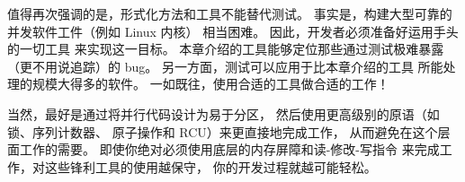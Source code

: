 值得再次强调的是，形式化方法和工具不能替代测试。
事实是，构建大型可靠的并发软件工件（例如 Linux 内核）
相当困难。
因此，开发者必须准备好运用手头的一切工具
来实现这一目标。
本章介绍的工具能够定位那些通过测试极难暴露
（更不用说追踪）的 bug。
另一方面，测试可以应用于比本章介绍的工具
所能处理的规模大得多的软件。
一如既往，使用合适的工具做合适的工作！

当然，最好是通过将并行代码设计为易于分区，
然后使用更高级别的原语（如锁、序列计数器、
原子操作和 RCU）来更直接地完成工作，
从而避免在这个层面工作的需要。
即使你绝对必须使用底层的内存屏障和读-修改-写指令
来完成工作，对这些锋利工具的使用越保守，
你的开发过程就越可能轻松。
